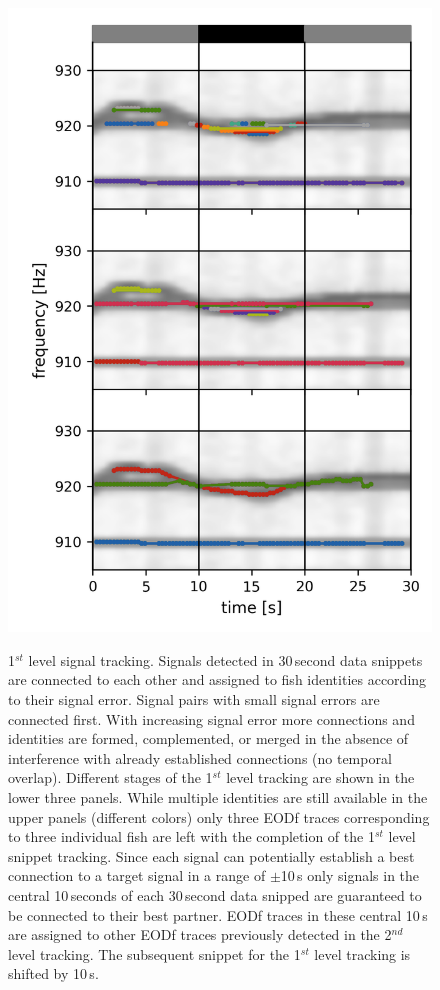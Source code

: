 \documentclass[11pt,pdftex]{article}
\begin{document}
\begin{figure}[t]
  \begin{minipage}[t]{0.4\textwidth}\mbox{}\\[-2ex]
    \includegraphics{tmp_ident_tracking}
  \end{minipage}
  \hfill
  \begin{minipage}[t]{0.43\textwidth}
  \caption{\label{tmp_tracking} 1$^{st}$ level signal tracking. Signals detected in  30\,second data snippets are connected to each other and assigned to fish identities according to their signal error. Signal pairs with small signal errors are connected first. With increasing signal error more connections and identities are formed, complemented, or merged in the absence of interference with already established connections (no temporal overlap). Different stages of the 1$^{st}$ level tracking are shown in the lower three panels. While multiple identities are still available in the upper panels (different colors) only three EODf traces corresponding to three individual fish are left with the completion of the 1$^{st}$ level snippet tracking. Since each signal can potentially establish a best connection to a target signal in a range of $\pm$10\,s only signals in the central 10\,seconds of each 30\,second data snipped are guaranteed to be connected to their best partner. EODf traces in these central 10\,s are assigned to other EODf traces previously detected in the 2$^{nd}$ level tracking. The subsequent snippet for the 1$^{st}$ level tracking is shifted by 10\,s.}

\end{minipage}
\end{figure}
\end{document}
